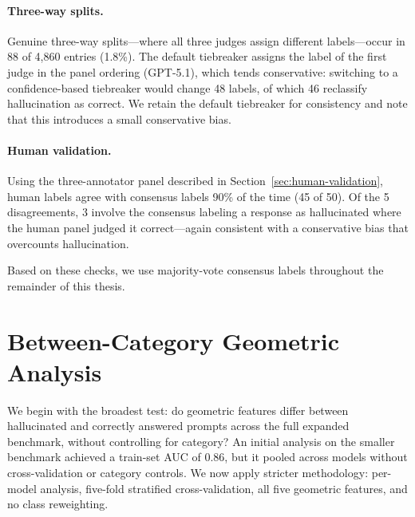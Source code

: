 \paragraph{Three-way splits.} Genuine three-way splits---where all three judges assign different labels---occur in 88 of 4,860 entries (1.8\%). The default tiebreaker assigns the label of the first judge in the panel ordering (GPT-5.1), which tends conservative: switching to a confidence-based tiebreaker would change 48 labels, of which 46 reclassify hallucination as correct. We retain the default tiebreaker for consistency and note that this introduces a small conservative bias.

\paragraph{Human validation.} Using the three-annotator panel described in Section~\ref{sec:human-validation}, human labels agree with consensus labels 90\% of the time (45 of 50). Of the 5 disagreements, 3 involve the consensus labeling a response as hallucinated where the human panel judged it correct---again consistent with a conservative bias that overcounts hallucination.

Based on these checks, we use majority-vote consensus labels throughout the remainder of this thesis.

\section{Between-Category Geometric Analysis}
\label{sec:between-category}

We begin with the broadest test: do geometric features differ between hallucinated and correctly answered prompts across the full expanded benchmark, without controlling for category? An initial analysis on the smaller benchmark achieved a train-set AUC of 0.86, but it pooled across models without cross-validation or category controls. We now apply stricter methodology: per-model analysis, five-fold stratified cross-validation, all five geometric features, and no class reweighting.

